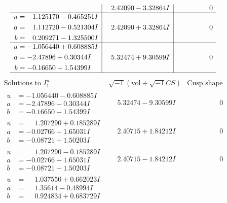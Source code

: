 \documentclass[1p]{elsarticle_modified}
\theoremstyle{definition}
\newcommand{\I}{\sqrt{-1}}
\begin{document}
$$\begin{array}{c|c|c}
 & \phantom{-}2.42090 - 3.32864 I & \phantom{-0.000000 } 0 \\ \hline\begin{aligned}
u &= \phantom{-}1.125170 - 0.465251 I \\
a &= \phantom{-}1.112720 - 0.521304 I \\
b &= \phantom{-}0.209271 - 1.325500 I\end{aligned}
 & \phantom{-}2.42090 + 3.32864 I & \phantom{-0.000000 } 0 \\ \hline\begin{aligned}
u &= -1.056440 + 0.608885 I \\
a &= -2.47896 + 0.30344 I \\
b &= -0.16650 + 1.54399 I\end{aligned}
 & \phantom{-}5.32474 + 9.30599 I & \phantom{-0.000000 } 0\\
 \hline 
 \end{array}$$\newpage$$\begin{array}{c|c|c}  
\text{Solutions to }I^u_{1}& \I (\text{vol} + \sqrt{-1}CS) & \text{Cusp shape}\\
 \hline 
\begin{aligned}
u &= -1.056440 - 0.608885 I \\
a &= -2.47896 - 0.30344 I \\
b &= -0.16650 - 1.54399 I\end{aligned}
 & \phantom{-}5.32474 - 9.30599 I & \phantom{-0.000000 } 0 \\ \hline\begin{aligned}
u &= \phantom{-}1.207290 + 0.185289 I \\
a &= -0.02766 + 1.65031 I \\
b &= -0.08721 + 1.50203 I\end{aligned}
 & \phantom{-}2.40715 + 1.84212 I & \phantom{-0.000000 } 0 \\ \hline\begin{aligned}
u &= \phantom{-}1.207290 - 0.185289 I \\
a &= -0.02766 - 1.65031 I \\
b &= -0.08721 - 1.50203 I\end{aligned}
 & \phantom{-}2.40715 - 1.84212 I & \phantom{-0.000000 } 0 \\ \hline\begin{aligned}
u &= \phantom{-}1.037550 + 0.662023 I \\
a &= \phantom{-}1.35614 - 0.48994 I \\
b &= \phantom{-}0.924834 + 0.683729 I\end{aligned}

\end{array}$$
\end{document}
